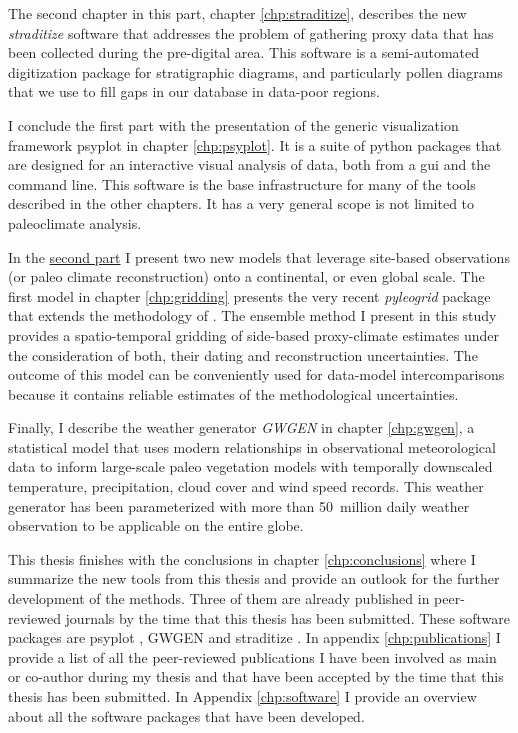 \begin{refsection}
The second chapter in this part, chapter \ref{chp:straditize}, describes the new \textit{straditize} software that addresses the problem of gathering proxy data that has been collected during the pre-digital area. This software is a semi-automated digitization package for stratigraphic diagrams, and particularly pollen diagrams that we use to fill gaps in our database in data-poor regions.

I conclude the first part with the presentation of the generic visualization framework psyplot in chapter \ref{chp:psyplot}. It is a suite of python packages that are designed for an interactive visual analysis of data, both from a \gls{gui} and the command line. This software is the base infrastructure for many of the tools described in the other chapters. It has a very general scope is not limited to paleoclimate analysis.

In the \hyperref[part:models]{second part} I present two new models that leverage site-based observations (or paleo climate reconstruction) onto a continental, or even global scale. The first model in chapter \ref{chp:gridding} presents the very recent \textit{pyleogrid} package that extends the methodology of \citep{MauriDavisCollinsEtAl2015}. The ensemble method I present in this study provides a spatio-temporal gridding of side-based proxy-climate estimates under the consideration of both, their dating and reconstruction uncertainties. The outcome of this model can be conveniently used for data-model intercomparisons because it contains reliable estimates of the methodological uncertainties.

Finally, I describe the weather generator \textit{GWGEN} in chapter \ref{chp:gwgen}, a statistical model that uses modern relationships in observational meteorological data to inform large-scale paleo vegetation models with temporally downscaled temperature, precipitation, cloud cover and wind speed records. This weather generator has been parameterized with more than 50~million daily weather observation to be applicable on the entire globe.

This thesis finishes with the conclusions in chapter \ref{chp:conclusions} where I summarize the new tools from this thesis and provide an outlook for the further development of the methods. Three of them are already published in peer-reviewed journals by the time that this thesis has been submitted. These software packages are psyplot \citep{Sommer2017}, GWGEN \citep{SommerKaplan2017b} and straditize \citep{SommerRechChevalierEtAl2019}. In appendix \ref{chp:publications} I provide a list of all the peer-reviewed publications I have been involved as main or co-author during my thesis and that have been accepted by the time that this thesis has been submitted. In Appendix \ref{chp:software} I provide an overview about all the software packages that have been developed.

\printbibliography[heading=subbibintoc]

\end{refsection}
